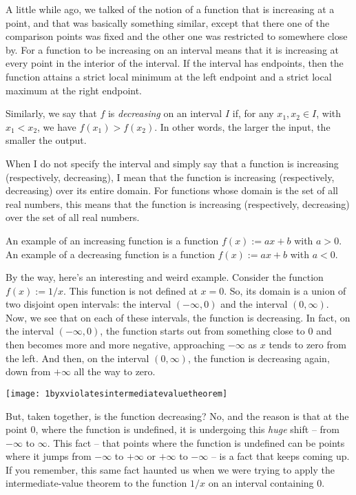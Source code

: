 \documentclass[10pt]{amsart}
\begin{document}
A little while ago, we talked of the notion of a function that is
increasing at a point, and that was basically something similar,
except that there one of the comparison points was fixed and the other
one was restricted to somewhere close by. For a function to be
increasing on an interval means that it is increasing at every point
in the interior of the interval. If the interval has endpoints, then
the function attains a strict local minimum at the left endpoint and a
strict local maximum at the right endpoint.

Similarly, we say that $f$ is {\em decreasing} on an interval $I$ if,
for any $x_1, x_2 \in I$, with $x_1 < x_2$, we have $f(x_1) >
f(x_2)$. In other words, the larger the input, the smaller the output.

When I do not specify the interval and simply say that a function is
increasing (respectively, decreasing), I mean that the function is
increasing (respectively, decreasing) over its entire domain. For
functions whose domain is the set of all real numbers, this means that
the function is increasing (respectively, decreasing) over the set of
all real numbers.

An example of an increasing function is a function $f(x) := ax + b$
with $a > 0$. An example of a decreasing function is a function $f(x)
:= ax + b$ with $a < 0$.

By the way, here's an interesting and weird example. Consider the
function $f(x) := 1/x$. This function is not defined at $x = 0$. So,
its domain is a union of two disjoint open intervals: the interval
$(-\infty,0)$ and the interval $(0,\infty)$. Now, we see that on each
of these intervals, the function is decreasing. In fact, on the
interval $(-\infty,0)$, the function starts out from something close
to $0$ and then becomes more and more negative, approaching $-\infty$
as $x$ tends to zero from the left. And then, on the interval
$(0,\infty)$, the function is decreasing again, down from $+\infty$
all the way to zero.

\texttt{[image: 1byxviolatesintermediatevaluetheorem]}

But, taken together, is the function decreasing? No, and the reason is
that at the point $0$, where the function is undefined, it is
undergoing this {\em huge} shift -- from $-\infty$ to $\infty$. This
fact -- that points where the function is undefined can be points
where it jumps from $-\infty$ to $+\infty$ or $+\infty$ to $-\infty$
-- is a fact that keeps coming up. If you remember, this same fact
haunted us when we were trying to apply the intermediate-value theorem
to the function $1/x$ on an interval containing $0$.
\end{document}
